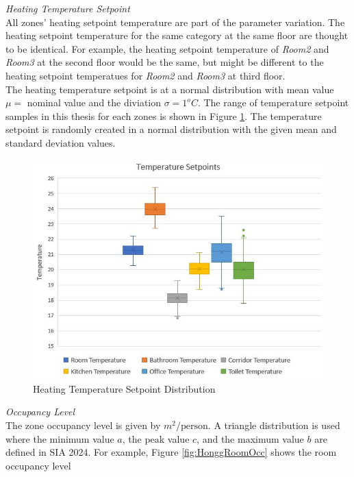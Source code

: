 \documentclass[a4paper, oneside]{discothesis}
\begin{document}
		\textit{Heating Temperature Setpoint}\\
			All zones' heating setpoint temperature are part of the parameter variation. The heating setpoint temperature for the same category at the same floor are thought to be identical. For example, the heating setpoint temperature of \textit{Room2} and \textit{Room3} at the second floor would be the same, but might be different to the heating setpoint temperatues for \textit{Room2} and \textit{Room3} at third floor.\\
			The heating temperature setpoint is at a normal distribution with mean value $\mu =$ nominal value and the diviation $\sigma = 1 ^oC$. The range of temperature setpoint samples in this thesis for each zones is shown in Figure \ref{fig:TempSetpoint}. The temperature setpoint is randomly created in a normal distribution with the given mean and standard deviation values.\\

			\begin{figure}[H]
			\centering
			\includegraphics[scale=0.7]{Residential_TempSetpoint.jpg}
			\caption{Heating Temperature Setpoint Distribution}
			\label{fig:TempSetpoint}
			\end{figure}
		
		\textit{Occupancy Level}\\
			The zone occupancy level is given by $m^2/\text{person}$. A triangle distribution is used where the minimum value $a$, the peak value $c$, and the maximum value $b$ are defined in SIA 2024. For example, Figure \ref{fig:HonggRoomOcc} shows the room occupancy level
\end{document}
